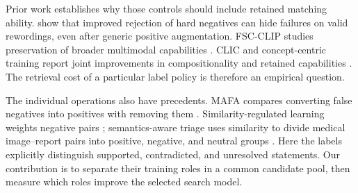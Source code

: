 Prior work establishes why those controls should include retained matching ability. \citet{kamath2024hardpositive} show that improved rejection of hard negatives can hide failures on valid rewordings, even after generic positive augmentation. FSC-CLIP studies preservation of broader multimodal capabilities \citep{oh2024fsc}. CLIC and concept-centric training report joint improvements in compositionality and retained capabilities \citep{peleg2025clic,pham2026nohard}. The retrieval cost of a particular label policy is therefore an empirical question.

The individual operations also have precedents. MAFA compares converting false negatives into positives with removing them \citep{byun2024mafa}. Similarity-regulated learning weights negative pairs \citep{jiang2023regulation}; semantics-aware triage uses similarity to divide medical image--report pairs into positive, negative, and neutral groups \citep{liu2023sat}. Here the labels explicitly distinguish supported, contradicted, and unresolved statements. Our contribution is to separate their training roles in a common candidate pool, then measure which roles improve the selected search model.
